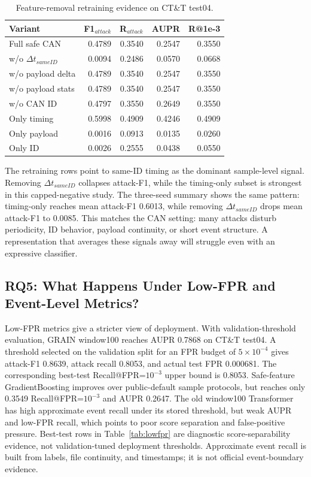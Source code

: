 \documentclass[runningheads]{llncs}%
\newcommand{\attf}{F1$_{attack}$}
\newcommand{\ratt}{R$_{attack}$}
\begin{document}
\begin{table}[!htbp]
\caption{Feature-removal retraining evidence on CT\&T test04.}
\label{tab:mechanism}
\centering
\small
\begin{tabular*}{0.98\textwidth}{@{\extracolsep{\fill}}lrrrr@{}}
\hline
Variant & \attf & \ratt & AUPR & R@1e-3 \\
\hline
Full safe CAN & 0.4789 & 0.3540 & 0.2547 & 0.3550 \\
w/o $\Delta t_{sameID}$ & 0.0094 & 0.2486 & 0.0570 & 0.0668 \\
w/o payload delta & 0.4789 & 0.3540 & 0.2547 & 0.3550 \\
w/o payload stats & 0.4789 & 0.3540 & 0.2547 & 0.3550 \\
w/o CAN ID & 0.4797 & 0.3550 & 0.2649 & 0.3550 \\
Only timing & 0.5998 & 0.4909 & 0.4246 & 0.4909 \\
Only payload & 0.0016 & 0.0913 & 0.0135 & 0.0260 \\
Only ID & 0.0026 & 0.2555 & 0.0438 & 0.0550 \\
\hline
\end{tabular*}
\end{table}

The retraining rows point to same-ID timing as the dominant sample-level signal.  Removing $\Delta t_{sameID}$ collapses attack-F1, while the timing-only subset is strongest in this capped-negative study.  The three-seed summary shows the same pattern: timing-only reaches mean attack-F1 0.6013, while removing $\Delta t_{sameID}$ drops mean attack-F1 to 0.0085.  This matches the CAN setting: many attacks disturb periodicity, ID behavior, payload continuity, or short event structure.  A representation that averages these signals away will struggle even with an expressive classifier.

\subsection{RQ5: What Happens Under Low-FPR and Event-Level Metrics?}
Low-FPR metrics give a stricter view of deployment.  With validation-threshold evaluation, GRAIN window100 reaches AUPR 0.7868 on CT\&T test04.  A threshold selected on the validation split for an FPR budget of $5\times10^{-4}$ gives attack-F1 0.8639, attack recall 0.8053, and actual test FPR 0.000681.  The corresponding best-test Recall@FPR=$10^{-3}$ upper bound is 0.8053.  Safe-feature GradientBoosting improves over public-default sample protocols, but reaches only 0.3549 Recall@FPR=$10^{-3}$ and AUPR 0.2647.  The old window100 Transformer has high approximate event recall under its stored threshold, but weak AUPR and low-FPR recall, which points to poor score separation and false-positive pressure.  Best-test rows in Table~\ref{tab:lowfpr} are diagnostic score-separability evidence, not validation-tuned deployment thresholds.  Approximate event recall is built from labels, file continuity, and timestamps; it is not official event-boundary evidence.
\end{document}
